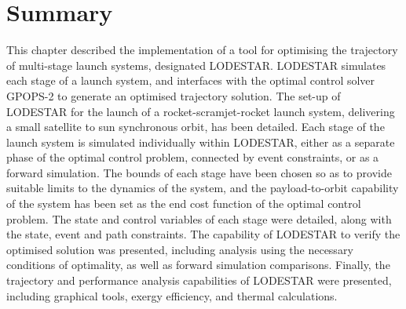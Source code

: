 \section{Summary}
This chapter described the implementation of a tool for optimising the trajectory of multi-stage launch systems, designated LODESTAR. 
LODESTAR simulates each stage of a launch system, and interfaces with the optimal control solver GPOPS-2 to generate an optimised trajectory solution. 
The set-up of LODESTAR for the launch of a rocket-scramjet-rocket launch system, delivering a small satellite to sun synchronous orbit, has been detailed. 
Each stage of the launch system is simulated individually within LODESTAR, either as a separate phase of the optimal control problem, connected by event constraints, or as a forward simulation. 
The bounds of each stage have been chosen so as to provide suitable limits to the dynamics of the system, and the payload-to-orbit capability of the system has been set as the end cost function of the optimal control problem. 
The state and control variables of each stage were detailed, along with the state, event and path constraints.
The capability of LODESTAR to verify the optimised solution was presented, including analysis using the necessary conditions of optimality, as well as forward simulation comparisons.
Finally, the trajectory and performance analysis capabilities of LODESTAR were presented, including graphical tools, exergy efficiency, and thermal calculations. 
